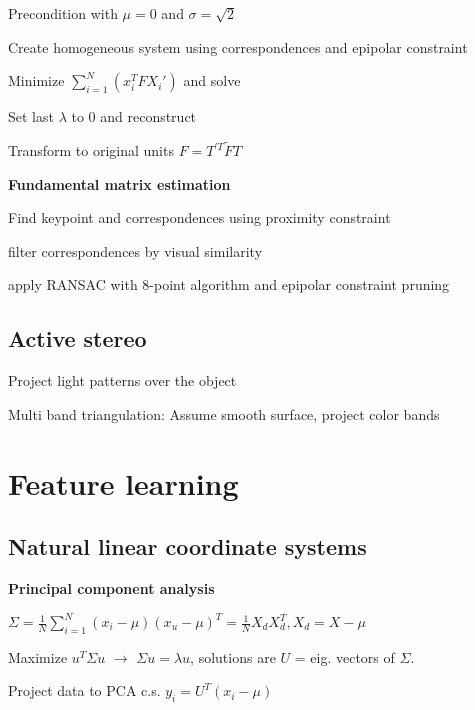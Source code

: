 \documentclass{article}
\begin{document}
\begin{multicols*}{2}
{\begin{compactenum}
	\item Precondition with $\mu = 0$ and $\sigma = \sqrt{2}$
	\item Create homogeneous system using correspondences and epipolar constraint
	\item Minimize $\sum_{i=1}^{N}(x_i^TFX_i')$ and solve
	\item Set last $\lambda$ to 0 and reconstruct
	\item Transform to original units $F = T^{'T}\tilde{F}T$

\end{compactenum}

\textbf{Fundamental matrix estimation}

\begin{compactenum}
	\item Find keypoint and correspondences using proximity constraint
	\item filter correspondences by visual similarity
	\item apply RANSAC with 8-point algorithm and epipolar constraint pruning

\end{compactenum}


\subsection{Active stereo}

Project light patterns over the object

Multi band triangulation: Assume smooth surface, project color bands

\section{Feature learning}

\subsection{Natural linear coordinate systems}

\textbf{Principal component analysis}

$\Sigma = \frac{1}{N}\sum_{i=1}^{N}(x_i - \mu)(x_u - \mu)^T = \frac{1}{N}X_dX_d^T, X_d = X - \mu$

Maximize $u^T\Sigma u$ $\rightarrow$ $\Sigma u = \lambda u$, solutions are $U$ = eig. vectors of $\Sigma$.

Project data to PCA c.s. $y_i = U^T(x_i-\mu)$

}
\end{multicols*}
\end{document}
